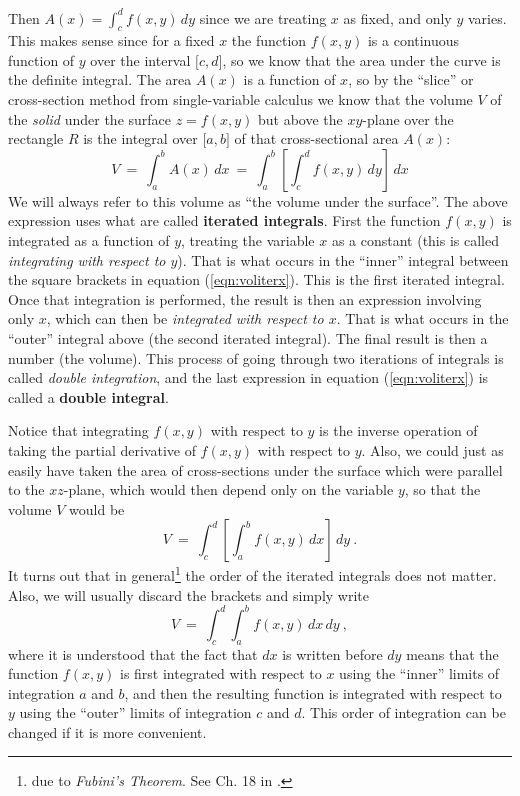 Then $A(x) = \int_c^d f(x,y)\,dy$ since we are treating $x$ as fixed, and only $y$ varies. This makes sense since
for a fixed $x$ the function $f(x,y)$ is a continuous function of $y$ over the interval $\lbrack c,d \rbrack$, so
we know that the area under the curve is the definite integral. The area $A(x)$ is a function of $x$, so by the
``slice'' or cross-section method from single-variable calculus we know that the volume $V$ of the \emph{solid} under
the surface $z=f(x,y)$ but above the $xy$-plane over the rectangle $R$ is the integral over $\lbrack a,b \rbrack$ of
that cross-sectional area $A(x)$:
\begin{equation}\label{eqn:voliterx}
 V ~=~ \int_a^b A(x)\,dx ~=~ \int_a^b \left[ \int_c^d f(x,y)\,dy \right] \,dx
\end{equation}
We will always refer to this volume as ``the volume under the surface''.
The above expression uses what are called \textbf{iterated integrals}. First the function $f(x,y)$ is integrated as a
function of $y$, treating the variable $x$ as a constant (this is called \emph{integrating with respect to $y$}). That
is what occurs in the ``inner'' integral between the square brackets in equation (\ref{eqn:voliterx}). This is the
first iterated integral.
Once that integration is performed, the result is then an expression involving only $x$, which can then be
\emph{integrated with respect to $x$}. That is what occurs in the ``outer'' integral above (the second iterated
integral). The final result is
then a number (the volume). This process of going through two iterations of integrals is called \emph{double
integration}, and the last expression in equation (\ref{eqn:voliterx}) is called a \textbf{double integral}.

Notice that integrating $f(x,y)$ with respect to $y$ is the inverse operation of taking the partial
derivative of $f(x,y)$ with respect to $y$. Also, we could just as easily have taken the area of cross-sections under
the surface which were parallel to the $xz$-plane, which would then depend only on the variable $y$, so that the volume
$V$ would be
\begin{equation}\label{eqn:volitery}
 V ~=~ \int_c^d \left[ \int_a^b f(x,y)\,dx \right] \,dy ~.
\end{equation}
It turns out that in general\footnote{due to \emph{Fubini's Theorem}. See Ch. 18 in \cite{tm}.} the order of the
iterated integrals does not matter. Also, we will usually discard the brackets and simply write
\begin{equation}\label{eqn:volint}
 V ~=~ \int_c^d \int_a^b f(x,y)\,dx \,dy ~,
\end{equation}
where it is understood that the fact that $dx$ is written before $dy$ means that the function $f(x,y)$ is first
integrated with respect to $x$ using the ``inner'' limits of integration $a$ and $b$, and then the resulting function
is integrated with respect to $y$ using the ``outer'' limits of integration $c$ and $d$. This order of integration can
be changed if it is more convenient.\index{$\iint$}

